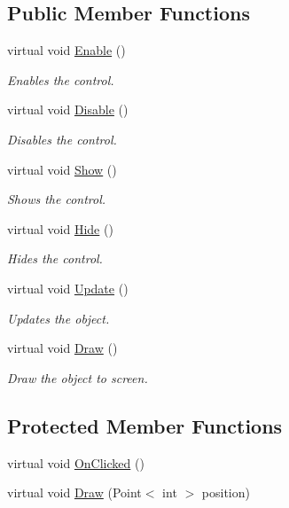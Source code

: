 \subsection*{Public Member Functions}
\begin{DoxyCompactItemize}
\item 
virtual void \hyperlink{class_tri_devs_1_1_tri_engine2_d_1_1_u_i_1_1_control_af0927254d6268f4d8548ff04e6043dd4}{Enable} ()
\begin{DoxyCompactList}\small\item\em Enables the control. \end{DoxyCompactList}\item 
virtual void \hyperlink{class_tri_devs_1_1_tri_engine2_d_1_1_u_i_1_1_control_ab8b829726e23d822e1b65f9355386bcf}{Disable} ()
\begin{DoxyCompactList}\small\item\em Disables the control. \end{DoxyCompactList}\item 
virtual void \hyperlink{class_tri_devs_1_1_tri_engine2_d_1_1_u_i_1_1_control_a5be351a3f27e9acf27542b83291c8651}{Show} ()
\begin{DoxyCompactList}\small\item\em Shows the control. \end{DoxyCompactList}\item 
virtual void \hyperlink{class_tri_devs_1_1_tri_engine2_d_1_1_u_i_1_1_control_aab4cd69da19b9bdfd232bdcfdad8131c}{Hide} ()
\begin{DoxyCompactList}\small\item\em Hides the control. \end{DoxyCompactList}\item 
virtual void \hyperlink{class_tri_devs_1_1_tri_engine2_d_1_1_u_i_1_1_control_aa8d0ceefa447589c60c278adfe059be1}{Update} ()
\begin{DoxyCompactList}\small\item\em Updates the object. \end{DoxyCompactList}\item 
virtual void \hyperlink{class_tri_devs_1_1_tri_engine2_d_1_1_u_i_1_1_control_a9b3ac8028bcf4b7e4d128e2be6f30fed}{Draw} ()
\begin{DoxyCompactList}\small\item\em Draw the object to screen. \end{DoxyCompactList}\end{DoxyCompactItemize}
\subsection*{Protected Member Functions}
\begin{DoxyCompactItemize}
\item 
virtual void \hyperlink{class_tri_devs_1_1_tri_engine2_d_1_1_u_i_1_1_control_aa5d2b95535bb697420b640e5db72bc48}{On\-Clicked} ()
\item 
virtual void \hyperlink{class_tri_devs_1_1_tri_engine2_d_1_1_u_i_1_1_control_a9cc14175331e6c7ab3d6c5b3326e2b3e}{Draw} (Point$<$ int $>$ position)
\end{DoxyCompactItemize}
